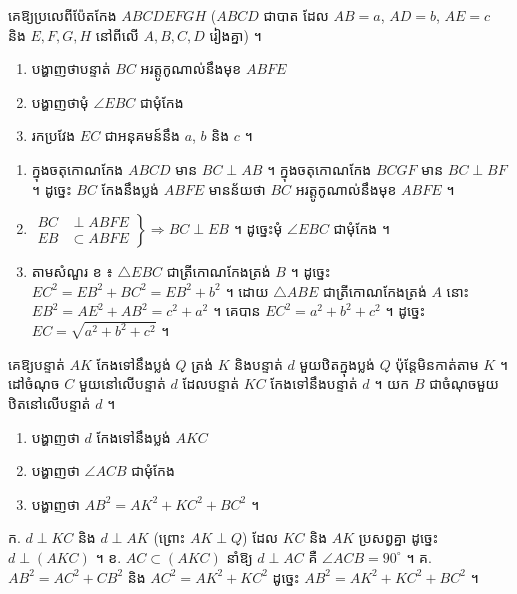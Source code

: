 \begin{example}[លំហាត់គំរូ]
គេឱ្យប្រលេពីប៉ែតកែង $ABCDEFGH$ ($ABCD$ ជាបាត ដែល $AB = a$, $AD = b$, $AE = c$ និង $E, F, G, H$ នៅពីលើ $A, B, C, D$ រៀងគ្នា) ។
\begin{enumerate}[a]
  \item បង្ហាញថាបន្ទាត់ $BC$ អរត្តូកូណាល់នឹងមុខ $ABFE$
  \item បង្ហាញថាមុំ $\angle EBC$ ជាមុំកែង
  \item រកប្រវែង $EC$ ជាអនុគមន៍នឹង $a$, $b$ និង $c$ ។
\end{enumerate}
\ans
\begin{enumerate}[a]
  \item ក្នុងចតុកោណកែង $ABCD$ មាន $BC \perp AB$ ។ ក្នុងចតុកោណកែង $BCGF$ មាន $BC \perp BF$ ។ ដូច្នេះ $BC$ កែងនឹងប្លង់ $ABFE$ មានន័យថា $BC$ អរត្តូកូណាល់នឹងមុខ $ABFE$ ។
  \item $\left.\begin{aligned} BC &\perp ABFE\\ EB &\subset ABFE \end{aligned}\right\} \Rightarrow BC \perp EB$ ។ ដូច្នេះមុំ $\angle EBC$ ជាមុំកែង ។
  \item តាមសំណួរ ខ ៖ $\triangle EBC$ ជាត្រីកោណកែងត្រង់ $B$ ។ ដូច្នេះ $EC^2 = EB^2 + BC^2 = EB^2 + b^2$ ។ ដោយ $\triangle ABE$ ជាត្រីកោណកែងត្រង់ $A$ នោះ $EB^2 = AE^2 + AB^2 = c^2 + a^2$ ។ គេបាន $EC^2 = a^2 + b^2 + c^2$ ។ ដូច្នេះ $EC = \sqrt{a^2 + b^2 + c^2}$ ។
\end{enumerate}
\end{example}

\begin{pro}
គេឱ្យបន្ទាត់ $AK$ កែងទៅនឹងប្លង់ $Q$ ត្រង់ $K$ និងបន្ទាត់ $d$ មួយឋិតក្នុងប្លង់ $Q$ ប៉ុន្តែមិនកាត់តាម $K$ ។ ដៅចំណុច $C$ មួយនៅលើបន្ទាត់ $d$ ដែលបន្ទាត់ $KC$ កែងទៅនឹងបន្ទាត់ $d$ ។ យក $B$ ជាចំណុចមួយឋិតនៅលើបន្ទាត់ $d$ ។
\begin{enumerate}[a]
  \item បង្ហាញថា $d$ កែងទៅនឹងប្លង់ $AKC$
  \item បង្ហាញថា $\angle ACB$ ជាមុំកែង
  \item បង្ហាញថា $AB^2 = AK^2 + KC^2 + BC^2$ ។
\end{enumerate}
\ans
ក. $d \perp KC$ និង $d \perp AK$ (ព្រោះ $AK \perp Q$) ដែល $KC$ និង $AK$ ប្រសព្វគ្នា ដូច្នេះ $d \perp (AKC)$ ។ \quad ខ. $AC \subset (AKC)$ នាំឱ្យ $d \perp AC$ គឺ $\angle ACB = 90^\circ$ ។ \quad គ. $AB^2 = AC^2 + CB^2$ និង $AC^2 = AK^2 + KC^2$ ដូច្នេះ $AB^2 = AK^2 + KC^2 + BC^2$ ។
\end{pro}

